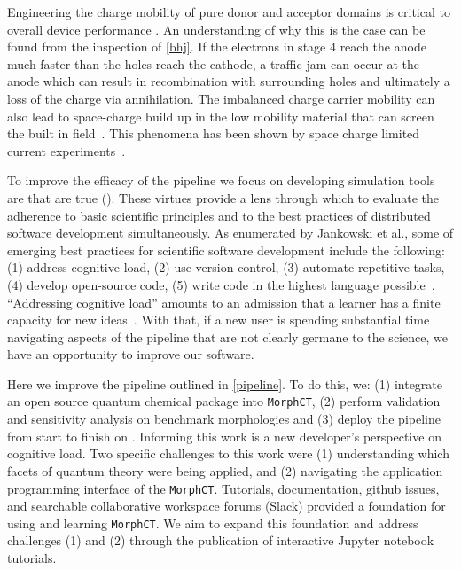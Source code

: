 
Engineering the charge mobility of pure donor and acceptor domains is critical
to overall device performance \cite{Wang2019e}.
An understanding of why this is the case can be found from the inspection of \autoref{bhj}.
If the electrons in stage $4$ reach the anode much faster than the holes reach the cathode, a traffic jam can
occur at the anode which can result in recombination with surrounding holes and ultimately a loss of the
charge via annihilation. 
The imbalanced charge carrier mobility can also lead to space-charge build up in the 
low mobility material that can screen the built in field~\cite{Bartelt2015}.
This phenomena has been shown by space charge limited current experiments~\cite{Small2013}.

To improve the efficacy of the pipeline we focus on
developing simulation tools are that are
\gls{true} (\cite{Cummings2017}).
These virtues provide a lens through which to %
evaluate the adherence to basic scientific principles and to the best practices of distributed software development
simultaneously. As enumerated by Jankowski et al., some of emerging best practices for scientific software
development include the following: (1) address cognitive load, (2) use version control, (3) automate %
repetitive tasks, (4) develop open-source code, (5) write code in the highest language possible~\cite{Jankowski2020}.
``Addressing cognitive load'' amounts to an admission that a learner has a
finite capacity for new ideas~\cite{Jankowski2019}. With that, if a new user is spending
substantial time navigating aspects of the pipeline that are not clearly
germane to the science, we have an opportunity to improve our software.

Here we improve the pipeline outlined in \autoref{pipeline}.
To do this, we: (1) integrate an open source quantum chemical package into \texttt{MorphCT},
(2) perform validation and sensitivity analysis on benchmark 
morphologies and
(3) deploy the pipeline from start to finish on . 
Informing this work is a new developer's perspective on cognitive load. 
Two specific challenges to this work were (1) understanding which facets of quantum
theory were being applied, and (2) navigating the application programming
interface of the \texttt{MorphCT}.
Tutorials, documentation, github issues, and searchable collaborative workspace
forums (Slack) provided a foundation for using and learning \texttt{MorphCT}.
We aim to expand this foundation and address challenges (1) and (2) through
the publication of interactive Jupyter notebook tutorials.


